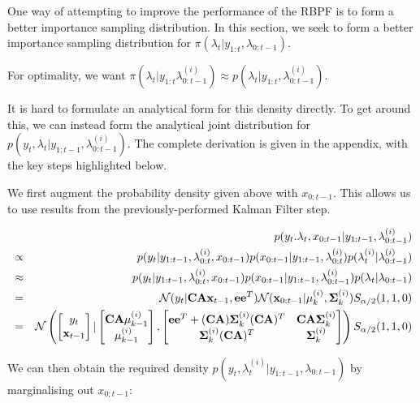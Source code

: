 \documentclass[../main.tex]{subfiles}
\begin{document}
One way of attempting to improve the performance of the RBPF is to form a better importance sampling distribution. In this section, we seek to form a better importance sampling distribution for $\pi(\lambda_t | y_{1:t}, \lambda_{0:t-1})$.

For optimality, we want $\pi(\lambda_t | y_{1:t} \lambda_{0:t-1}^{(i)}) \approx p(\lambda_t | y_{1:t}, \lambda_{0:t-1}^{(i)})$.


It is hard to formulate an analytical form for this density directly. To get around this, we can instead form the analytical joint distribution for $p(y_t, \lambda_t | y_{1:t-1}, \lambda_{0:t-1}^{(i)})$. The complete derivation is given in the appendix, with the key steps highlighted below. 

We first augment the probability density given above with $x_{0:t-1}$. This allows us to use results from the previously-performed Kalman Filter step.

\begin{eqnarray}
& & p(y_t. \lambda_t, x_{0:t-1} | y_{1:t-1}, \lambda_{0:t-1}^{(i)}) \notag \\
& \propto & p(y_t | y_{1:t-1}, \lambda_{0:t}^{(i)}, x_{0:t-1}) p(x_{0:t-1} | y_{1:t-1}, \lambda_{0:t}^{(i)}) p(\lambda_t^{(i)} | \lambda_{0:t-1}^{(i)}) \notag \\
& \approx & p(y_t | y_{1:t-1}, \lambda_{0:t}^{(i)}, x_{0:t-1}) p(x_{0:t-1} | y_{1:t-1}, \lambda_{0:t-1}^{(i)}) p(\lambda_t | \lambda_{0:t-1}) \notag \\
& = & \mathcal{N} (y_t | \mathbf{CAx}_{t-1}, \mathbf{ee}^T) \mathcal{N} (\mathbf{x}_{0:t-1} | \mathbf{\mu}_k^{(i)}, \mathbf{\Sigma}_k^{(i)}) S_{\alpha/2}(1,1,0) \notag \\
& = & \mathcal{N} \left(
\begin{bmatrix} y_t \\ {\bf x}_{t-1}  \end{bmatrix} | 
\begin{bmatrix} {\bf CA\mu}_{k-1}^{(i)} \\ \mu_{k-1}^{(i)}  \end{bmatrix},
\begin{bmatrix} {\bf ee}^T + ({\bf CA}){\bf \Sigma}_k^{(i)}({\bf CA})^T & {\bf CA\Sigma}_k^{(i)} \\ {\bf \Sigma}_k^{(i)}({\bf CA})^T & {\bf \Sigma}_k^{(i)} \end{bmatrix} 
\right)  S_{\alpha/2}(1,1,0) \notag
\end{eqnarray}

We can then obtain the required density $p(y_t, \lambda_t^{(i)} | y_{1:t-1}, \lambda_{0:t-1})$ by marginalising out $x_{0:t-1}$: 
\end{document}
